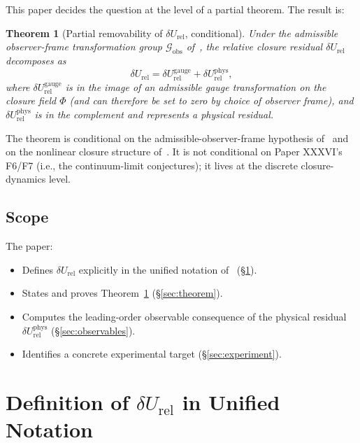 \documentclass[12pt]{article}
\newtheorem{theorem}{Theorem}
\theoremstyle{definition}
\theoremstyle{remark}
\newcommand{\dUrel}{\delta U_{\mathrm{rel}}}
\begin{document}
This paper decides the question at the level of a partial theorem. The result is:

\begin{theorem}[Partial removability of $\dUrel$, conditional]\label{thm:partial-remove}
Under the admissible observer-frame transformation group $\mathcal{G}_{\mathrm{obs}}$ of~\citep{SmartXXIX}, the relative closure residual $\dUrel$ decomposes as
\begin{equation}\label{eq:decomp}
\dUrel = \dUrel^{\mathrm{gauge}} + \dUrel^{\mathrm{phys}},
\end{equation}
where $\dUrel^{\mathrm{gauge}}$ is in the image of an admissible gauge transformation on the closure field $\Phi$ (and can therefore be set to zero by choice of observer frame), and $\dUrel^{\mathrm{phys}}$ is in the complement and represents a physical residual.
\end{theorem}

The theorem is conditional on the admissible-observer-frame hypothesis of~\citep{SmartXXIX} and on the nonlinear closure structure of~\citep{SmartXVIII, SmartXXI}. It is not conditional on Paper XXXVI's F6/F7 (i.e., the continuum-limit conjectures); it lives at the discrete closure-dynamics level.

\subsection{Scope}

The paper:
\begin{itemize}
\item Defines $\dUrel$ explicitly in the unified notation of~\citep{SmartXXXVI} (\S\ref{sec:define}).
\item States and proves Theorem~\ref{thm:partial-remove} (\S\ref{sec:theorem}).
\item Computes the leading-order observable consequence of the physical residual $\dUrel^{\mathrm{phys}}$ (\S\ref{sec:observables}).
\item Identifies a concrete experimental target (\S\ref{sec:experiment}).
\end{itemize}

\section{Definition of $\dUrel$ in Unified Notation}\label{sec:define}
\end{document}
